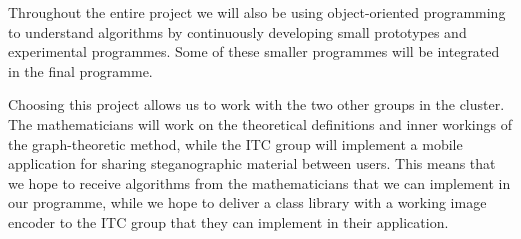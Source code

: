 Throughout the entire project we will also be using object-oriented programming to understand algorithms by continuously developing small prototypes and experimental programmes.
Some of these smaller programmes will be integrated in the final programme.

Choosing this project allows us to work with the two other groups in the cluster. The mathematicians will work on the theoretical definitions and inner workings of the graph-theoretic method, while the ITC group will implement a mobile application for sharing steganographic material between users. This means that we hope to receive algorithms from the mathematicians that we can implement in our programme, while we hope to deliver a class library with a working image encoder to the ITC group that they can implement in their application.